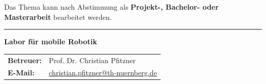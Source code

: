 \documentclass{ohm_project_description}
\begin{document}
\vspace{0.5cm}
Das Thema kann nach Abstimmung als \textbf{Projekt-, Bachelor- oder Masterarbeit} bearbeitet werden.

\vfill
\textcolor{ohm_red}{\rule{\linewidth}{0.4mm}}
\textbf{\textcolor{ohm_red}{Labor für mobile Robotik}} \\
\begin{tabular}{@{}ll}
\textbf{Betreuer:} & Prof. Dr. Christian Pfitzner \\
\textbf{E-Mail:}   & \href{mailto:christian.pfitzner@th-nuernberg.de}{christian.pfitzner@th-nuernberg.de} \\
\end{tabular}
\end{document}

